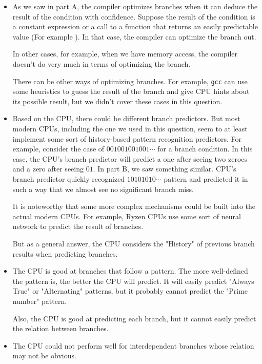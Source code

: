 \documentclass[12pt]{article}
\begin{document}
	
	\begin{itemize}
	\item 
	As we saw in part A, the compiler optimizes branches when it can deduce the result of the condition with confidence. Suppose the result of the condition is a constant expression or a call to a function that returns an easily predictable value (For example ). In that case, the compiler can optimize the branch out.
	
	In other cases, for example, when we have memory access, the compiler doesn't do very much in terms of optimizing the branch. 
	
	There can be other ways of optimizing branches. For example, \Verb+gcc+ can use some heuristics to guess the result of the branch and give CPU hints about its possible result, but we didn't cover these cases in this question.
	
	
	\item 
	Based on the CPU, there could be different branch predictors. But most modern CPUs, including the one we used in this question, seem to at least implement some sort of history-based pattern recognition predictors. For example, consider the case of $001001001001\cdots$ for a branch condition. In this case, the CPU's branch predictor will predict a one after seeing two zeroes and a zero after seeing $01$. In part B, we saw something similar. CPU's branch predictor quickly recognized $10101010\cdots$ pattern and predicted it in such a way that we almost see no significant branch miss.
	
	It is noteworthy that some more complex mechanisms could be built into the actual modern CPUs. For example, Ryzen CPUs use some sort of neural network to predict the result of branches.
	
	But as a general answer, the CPU considers the "History" of previous branch results when predicting branches.
	
	\item 
	
	
	The CPU is good at branches that follow a pattern. The more well-defined the pattern is, the better the CPU will predict. It will easily predict "Always True" or "Alternating" patterns, but it probably cannot predict the "Prime number" pattern.
	
	Also, the CPU is good at predicting each branch, but it cannot easily predict the relation between branches.
	
	\item 
	The CPU could not perform well for interdependent branches whose relation may not be obvious.
	

\end{itemize}
\end{document}
